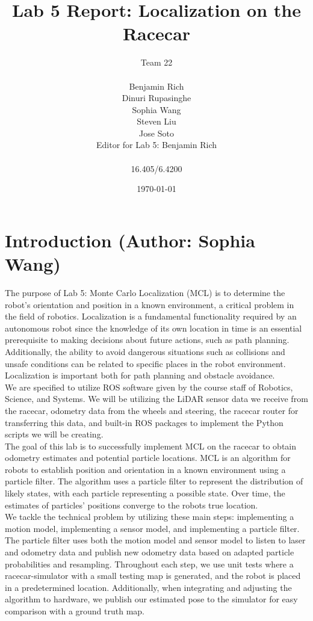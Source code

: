 \documentclass{article}
\title{Lab 5 Report: Localization on the Racecar} %
\author{Team 22 \\\\ Benjamin Rich \\ Dinuri Rupasinghe \\ Sophia Wang \\ Steven Liu \\ Jose Soto  \\ Editor for Lab 5: Benjamin Rich\\\\ 16.405/6.4200} %
\date{\today} %
\begin{document}
\maketitle


\tableofcontents
\newpage


\section{Introduction (Author: Sophia Wang)}
The purpose of Lab 5: Monte Carlo Localization (MCL) is to determine the robot's orientation and position in a known environment, a critical problem in the field of robotics. Localization is a fundamental functionality required by an autonomous robot since the knowledge of its own location in time is an essential prerequisite to making decisions about future actions, such as path planning. Additionally, the ability to avoid dangerous situations such as collisions and unsafe conditions can be related to specific places in the robot environment. Localization is important both for path planning and obstacle avoidance. \\

We are specified to utilize ROS software given by the course staff of Robotics, Science, and Systems. We will be utilizing the LiDAR sensor data we receive from the racecar, odometry data from the wheels and steering, the racecar router for transferring this data, and built-in ROS packages to implement the Python scripts we will be creating. \\

The goal of this lab is to successfully implement MCL on the racecar to obtain odometry estimates and potential particle locations. MCL is an algorithm for robots to establish position and orientation in a known environment using a particle filter. The algorithm uses a particle filter to represent the distribution of likely states, with each particle representing a possible state. Over time, the estimates of particles' positions converge to the robots true location. \\

We tackle the technical problem by utilizing these main steps: implementing a motion model, implementing a sensor model, and implementing a particle filter. The particle filter uses both the motion model and sensor model to listen to laser and odometry data and publish new odometry data based on adapted particle probabilities and resampling. Throughout each step, we use unit tests where a racecar-simulator with a small testing map is generated, and the robot is placed in a predetermined location. Additionally, when integrating and adjusting the algorithm to hardware, we publish our estimated pose to the simulator for easy comparison with a ground truth map. \\
\end{document}

